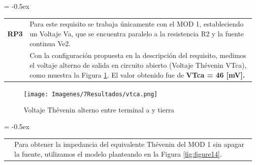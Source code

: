 \centering
\extrarowheight = -0.5ex
\renewcommand{\arraystretch}{2.25}
\begin{tabular}{p{} p{}}

\textbf{RP3} & Para este requisito se trabaja únicamente con el MOD 1, estableciendo un Voltaje Va, que se encuentra paralelo a la resistencia R2 y la fuente continua Ve2.\\
& Con la configuración propuesta en la descripción del requisito, medimos el voltaje alterno de salida en circuito abierto (Voltaje Thévenin VTca), como muestra la Figura \ref{fig:figure13}. El valor obtenido fue de \textbf{VTca = 46 [mV].} \\ 
\end{tabular}

\begin{figure}[h]
    \Centering
    \texttt{[image: Imagenes/7Resultados/vtca.png]}
    \caption{Voltaje Thévenin alterno entre terminal a y tierra}
	\label{fig:figure13}
\end{figure}

\centering
\extrarowheight = -0.5ex
\renewcommand{\arraystretch}{2.25}
\begin{tabular}{p{} p{}}

& Para obtener la impedancia del equivalente Thévenin del MOD 1 sin apagar la fuente, utilizamos el modelo planteando en la Figura \ref{fig:figure14}.\\
\end{tabular}

